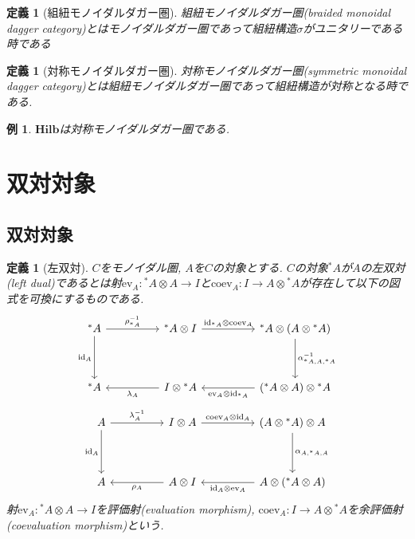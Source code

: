 \documentclass[a4paper,12pt]{ltjsarticle}
\theoremstyle{break}
\newtheorem{defn}[thm]{定義}
\newtheorem{eg}[thm]{例}
\newcommand{\hilb}{\mathbf{Hilb}}
\newcommand{\id}{\mathrm{id}}
\newcommand{\eva}{\mathrm{ev}}
\newcommand{\coev}{\mathrm{coev}}
\newcommand{\al}{\alpha}
\newcommand{\la}{\lambda}
\newcommand{\si}{\sigma}
\newcommand{\ot}{\otimes}
\numberwithin{equation}{section}
\begin{document}
\begin{defn}[組紐モノイダルダガー圏]
  組紐モノイダルダガー圏(braided monoidal dagger category)とはモノイダルダガー圏であって組紐構造$\si$がユニタリーである時である
\end{defn}

\begin{defn}[対称モノイダルダガー圏]
  対称モノイダルダガー圏(symmetric monoidal dagger category)とは組紐モノイダルダガー圏であって組紐構造が対称となる時である. 
\end{defn}

\begin{eg}
  $\hilb$は対称モノイダルダガー圏である.
\end{eg}

\newpage

\section{双対対象}

\subsection{双対対象}

\begin{defn}[左双対]
  $C$をモノイダル圏, $A$を$C$の対象とする. 
  $C$の対象${}^*A$が$A$の左双対(left dual)であるとは射$\eva_A: {}^*A \ot A \to I$と$\coev_A: I \to A \ot {}^*A$が存在して以下の図式を可換にするものである. 
  \[\begin{tikzcd}
    {}^*A && {{}^*A \ot I} && {{}^*A \ot (A \ot {}^*A)} \\
    \\
    {}^*A && {I \ot {}^*A} && {({}^*A \ot A) \ot {}^*A}
    \arrow["{\rho_{{}^*A}^{-1}}", from=1-1, to=1-3]
    \arrow["{\id_{{}^*A} \ot \coev_A}", from=1-3, to=1-5]
    \arrow["{\id_A}"', from=1-1, to=3-1]
    \arrow["{\la_A}", from=3-3, to=3-1]
    \arrow["{\eva_A \ot \id_{{}^*A}}", from=3-5, to=3-3]
    \arrow["{\al_{{}^*A,A,{}^*A}^{-1}}", from=1-5, to=3-5]
  \end{tikzcd}\]
  \[\begin{tikzcd}
    A && {I \ot A} && {(A \ot {}^*A) \ot A} \\
    \\
    A && {A \ot I} && {A \ot ({}^*A \ot A)}
    \arrow["{\la_A^{-1}}", from=1-1, to=1-3]
    \arrow["{\coev_A \ot \id_A }", from=1-3, to=1-5]
    \arrow["{\id_A}"', from=1-1, to=3-1]
    \arrow["{\rho_A}", from=3-3, to=3-1]
    \arrow["{\id_A \ot \eva_A}", from=3-5, to=3-3]
    \arrow["{\al_{A,{}^*A,A}}", from=1-5, to=3-5]
  \end{tikzcd}\]
  射$\eva_A: {}^*A \ot A \to I$を評価射(evaluation morphism), $\coev_A: I \to A \ot {}^*A$を余評価射(coevaluation morphism)という. 
\end{defn}
\end{document}
